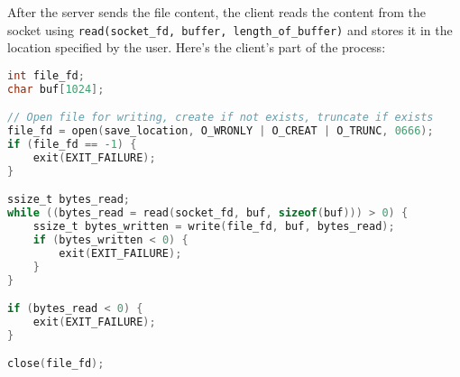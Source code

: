 \documentclass[a4paper,12pt]{article}
\begin{document}
After the server sends the file content, the client reads the content from the socket using \texttt{read(socket\_fd, buffer, length\_of\_buffer)} and stores it in the location specified by the user. Here's the client's part of the process:

\begin{lstlisting}[language=C]
int file_fd;
char buf[1024];

// Open file for writing, create if not exists, truncate if exists
file_fd = open(save_location, O_WRONLY | O_CREAT | O_TRUNC, 0666);
if (file_fd == -1) {
    exit(EXIT_FAILURE);
}

ssize_t bytes_read;
while ((bytes_read = read(socket_fd, buf, sizeof(buf))) > 0) {
    ssize_t bytes_written = write(file_fd, buf, bytes_read);
    if (bytes_written < 0) {
        exit(EXIT_FAILURE);
    }
}

if (bytes_read < 0) {
    exit(EXIT_FAILURE);
}

close(file_fd);
\end{lstlisting}
\end{document}
